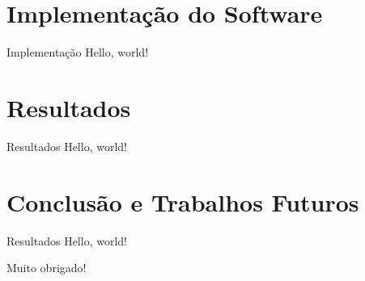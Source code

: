 \documentclass{beamer}
\begin{document}
\section{Implementação do Software}
\begin{frame}{Implementação}
  Hello, world!
\end{frame}

\section{Resultados}
\begin{frame}{Resultados}
  Hello, world!
\end{frame}

\section{Conclusão e Trabalhos Futuros}
\begin{frame}{Resultados}
  Hello, world!
\end{frame}

\begin{frame}
  Muito obrigado!
\end{frame}
\end{document}
